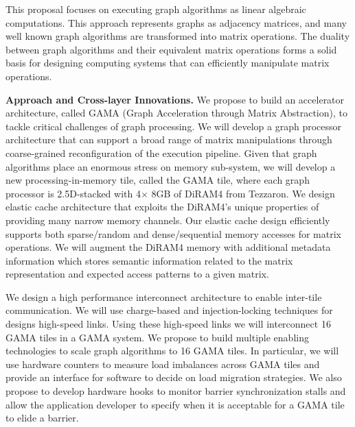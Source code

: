 \noindent
This proposal focuses on executing graph algorithms as linear algebraic computations. 
This approach represents graphs as adjacency matrices, and many well known graph algorithms are transformed into matrix operations. 
The %
duality between graph algorithms and their equivalent matrix operations forms a solid basis for designing computing systems that can efficiently manipulate matrix operations. 

\vspace{3pt}
\noindent
\textbf{Approach and Cross-layer Innovations.} 
We propose to build an accelerator architecture, called GAMA (Graph Acceleration through Matrix Abstraction), to tackle critical challenges of graph processing. 
We will develop a graph processor architecture that can support a broad range of matrix manipulations through coarse-grained reconfiguration of the execution pipeline. 
Given that graph algorithms place an enormous stress on memory sub-system, we will develop a new processing-in-memory tile, called the GAMA tile, where each graph processor is 2.5D-stacked with 4$\times$ 8GB of DiRAM4 from Tezzaron. We design elastic cache architecture that exploits the DiRAM4's unique properties of providing many narrow memory channels. 
Our elastic cache design efficiently supports both sparse/random and dense/sequential memory accesses for matrix operations. We will augment the DiRAM4 memory with additional metadata information which stores semantic information related to the matrix representation and expected access patterns to a given matrix.   

We design a high performance interconnect architecture to enable inter-tile communication. We will use  charge-based and injection-locking techniques for designs high-speed links.  Using these high-speed links we will interconnect 16 GAMA tiles in a GAMA system. We propose to build multiple enabling technologies to scale graph algorithms to 16 GAMA tiles. In particular, we will use hardware counters to measure load imbalances across GAMA tiles and provide an interface for software to decide on load migration strategies. We also propose to develop hardware hooks to monitor barrier synchronization stalls and allow the application developer to specify when it is acceptable for a GAMA tile to elide a barrier. 

